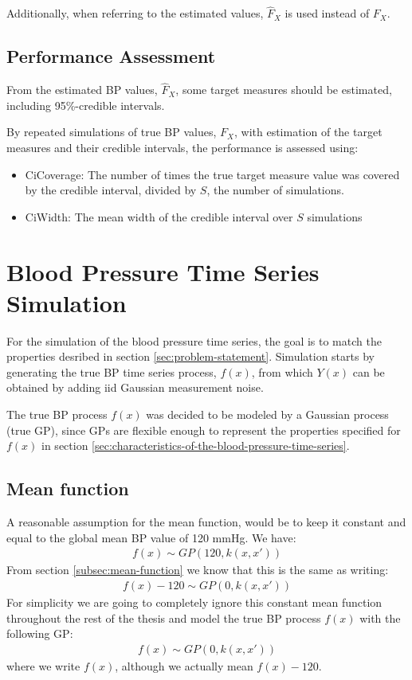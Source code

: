 Additionally, when referring to the estimated values,
$\hat{F}_X$ is used instead of $F_X$.


\subsection{Performance Assessment}
From the estimated BP values, $\hat{F}_X$, some target measures
should be estimated, including 95\%-credible intervals.

By repeated simulations of true BP values, $F_X$, with estimation of the
target measures and their credible intervals, the performance is
assessed using:
\begin{itemize}
    \item CiCoverage: The number of times the true target
    measure value was covered by the credible interval, divided by
    $S$, the number of simulations.
    \item CiWidth: The mean width of the credible interval over $S$ simulations
\end{itemize}


\section{Blood Pressure Time Series Simulation}\label{sec:blood-pressure-time-series-simulation}
For the simulation of the blood pressure time series, the goal is to match the properties
desribed in section \ref{sec:problem-statement}.
Simulation starts by generating the true BP time series process, $f(x)$,
from which $Y(x)$ can be obtained by adding iid Gaussian measurement noise.

The true BP process $f(x)$ was decided to be modeled by a Gaussian process
(true GP),
since GPs are flexible enough to represent the properties
specified for $f(x)$ in section \ref{sec:characteristics-of-the-blood-pressure-time-series}.

\subsection{Mean function}
A reasonable assumption for the mean function, would be to keep it constant and
equal to the global mean BP value of 120 mmHg. We have:
\begin{gather*}
    f(x) \sim GP(120, k(x,x'))
\end{gather*}
From section \ref{subsec:mean-function} we know that this is the same as writing:
\begin{gather*}
    f(x) - 120 \sim GP(0, k(x,x'))
\end{gather*}
For simplicity we are going to completely ignore this constant
mean function throughout the rest of the thesis and
model the true BP process $f(x)$ with the following
GP:
\begin{gather*}
    f(x) \sim GP(0, k(x,x'))
\end{gather*}
where we write $f(x)$, although we actually mean $f(x) - 120$.


